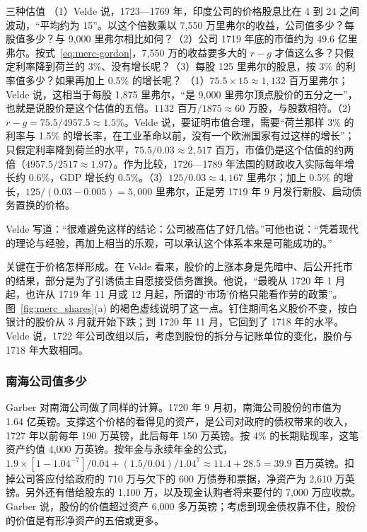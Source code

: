 \begin{example}{三种估值}\label{ex:merc-gordon}
（1）Velde 说，1723—1769 年，印度公司的价格股息比在 4 到 24 之间波动，“平均约为 15”。以这个倍数乘以 7,550 万里弗尔的收益，公司值多少？每股值多少？与 9,000 里弗尔相比如何？（2）公司 1719 年底的市值约为 49.6 亿里弗尔。按式~\eqref{eq:merc-gordon}，7,550 万的收益要多大的 $r-g$ 才值这么多？只假定利率降到荷兰的 3\%、没有增长呢？（3）每股 125 里弗尔的股息，按 3\% 的利率值多少？如果再加上 0.5\% 的增长呢？
\solution （1）$75.5\times15\approx1{,}132$ 百万里弗尔；Velde 说，这相当于每股 1,875 里弗尔，“是 9,000 里弗尔顶点股价的五分之一”，也就是说股价是这个估值的五倍\cite{velde2003}。$1132\text{ 百万}/1875\approx60$ 万股，与股数相符。（2）$r-g=75.5/4957.5\approx1.5\%$。Velde 说，要证明市值合理，需要“荷兰那样 3\% 的利率与 1.5\% 的增长率，在工业革命以前，没有一个欧洲国家有过这样的增长”；只假定利率降到荷兰的水平，$75.5/0.03\approx2{,}517$ 百万，市值仍是这个估值的约两倍（$4957.5/2517\approx1.97$）\cite{velde2003}。作为比较，1726—1789 年法国的财政收入实际每年增长约 0.6\%，GDP 增长约 0.5\%\cite{velde2003}。（3）$125/0.03\approx4{,}167$ 里弗尔；加上 0.5\% 的增长，$125/(0.03-0.005)=5{,}000$ 里弗尔，正是劳 1719 年 9 月发行新股、启动债务置换的价格\cite{velde2003}。
\end{example}

Velde 写道：“很难避免这样的结论：公司被高估了好几倍。”可他也说：“凭着现代的理论与经验，再加上相当的乐观，可以承认这个体系本来是可能成功的。”\cite{velde2003}

关键在于价格怎样形成。在 Velde 看来，股价的上涨本身是先暗中、后公开托市的结果，部分是为了引诱债主自愿接受债务置换。他说，“最晚从 1720 年 1 月起，也许从 1719 年 11 月或 12 月起，所谓的‘市场’价格只能看作劳的政策”\cite{velde2003}。图~\ref{fig:merc_shares}(a) 的褐色虚线说明了这一点。钉住期间名义股价不变，按白银计的股价从 3 月就开始下跌；到 1720 年 11 月，它回到了 1718 年的水平。Velde 说，1722 年公司改组以后，考虑到股份的拆分与记账单位的变化，股价与 1718 年大致相同\cite{velde2003}。

\subsubsection{南海公司值多少}
Garber 对南海公司做了同样的计算。1720 年 9 月初，南海公司股份的市值为 1.64 亿英镑。支撑这个价格的看得见的资产，是公司对政府的债权带来的收入，1727 年以前每年 190 万英镑，此后每年 150 万英镑。按 4\% 的长期贴现率，这笔资产约值 4,000 万英镑\cite{garber1990}。按年金与永续年金的公式，$1.9\times[1-1.04^{-7}]/0.04+(1.5/0.04)/1.04^{7}\approx11.4+28.5=39.9$ 百万英镑。扣掉公司答应付给政府的 710 万与欠下的 600 万债券和票据，净资产为 2,610 万英镑。另外还有借给股东的 1,100 万，以及现金认购者将来要付的 7,000 万应收款。Garber 说，股份的价值超过资产 6,000 多万英镑；考虑到现金债权靠不住，股份的价值是有形净资产的五倍或更多\cite{garber1990}。

